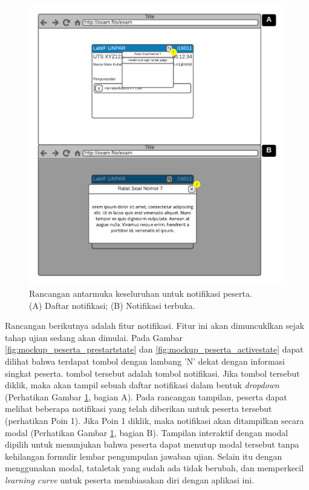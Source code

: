     \begin{figure}
        \centering
        \includegraphics[width=0.7\paperwidth]{Gambar/mockups/Mockup--Peserta - Notif.pdf}
        \caption{Rancangan antarmuka keseluruhan untuk notifikasi
        peserta. \\
            (A) Daftar notifikasi; (B) Notifikasi terbuka.}
        \label{fig:mockup_peserta_notif}
    \end{figure}
    Rancangan berikutnya adalah fitur notifikasi. Fitur ini akan dimuncuklkan
    sejak tahap ujian sedang akan dimulai. Pada Gambar
    \ref{fig:mockup_peserta_prestartstate} dan
    \ref{fig:mockup_peserta_activestate} dapat dilihat bahwa terdapat tombol
    dengan lambang 'N' dekat dengan informasi singkat peserta. tombol tersebut
    adalah tombol notifikasi. Jika tombol tersebut diklik, maka akan tampil
    sebuah daftar notifikasi dalam bentuk \textit{dropdown} (Perhatikan Gambar
    \ref{fig:mockup_peserta_notif}, bagian A). Pada rancangan tampilan, peserta
    dapat melihat beberapa notifikasi yang telah diberikan untuk peserta
    tersebut (perhatikan Poin 1). Jika Poin 1 diklik, maka notifikasi akan
    ditampilkan secara modal (Perhatikan Gambar \ref{fig:mockup_peserta_notif},
    bagian B). Tampilan interaktif dengan modal dipilih untuk menunjukan bahwa
    peserta dapat menutup modal tersebut tanpa kehilangan formulir lembar
    pengumpulan jawaban ujian. Selain itu dengan menggunakan modal, tataletak
    yang sudah ada tidak berubah, dan memperkecil \textit{learning curve} untuk
    peserta membiasakan diri dengan aplikasi ini.
    
